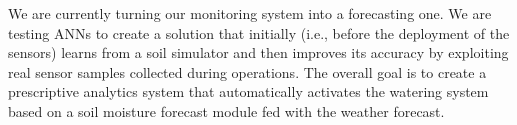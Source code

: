 We are currently turning our monitoring system into a forecasting one.
We are testing ANNs to create a solution that initially (i.e., before the deployment of the sensors) learns from a soil simulator and then improves its accuracy by exploiting real sensor samples collected during operations.
The overall goal is to create a prescriptive analytics system that automatically activates the watering system based on a soil moisture forecast module fed with the weather forecast.
